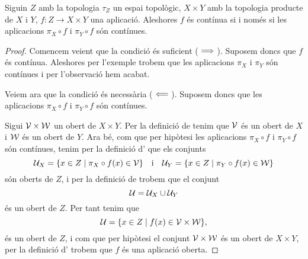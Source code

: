 \documentclass[../Apunts.tex]{subfiles}
\begin{document}
	\begin{theorem}
		\label{thm:una aplicació és contínua si i només si les seves components són contínues}
		Siguin \(Z\) amb la topologia \(\tau_{Z}\) un espai topològic, \(X\times Y\) amb la topologia producte de \(X\) i \(Y\), \(f\colon Z\longrightarrow X\times Y\) una aplicació. Aleshores \(f\) és contínua si i només si les aplicacions \(\pi_{X}\circ f\) i \(\pi_{Y}\circ f\) són contínues.
		\begin{proof}
			Comencem veient que la condició és suficient (\(\implies\)). Suposem doncs que \(f\) és contínua. Aleshores per l'exemple  trobem que les aplicacions \(\pi_{X}\) i \(\pi_{Y}\) són contínues i per l'observació  hem acabat.
			
			Veiem ara que la condició és necessària (\(\impliedby\)). Suposem doncs que les aplicacions \(\pi_{X}\circ f\) i \(\pi_{Y}\circ f\) són contínues.
			
			Sigui \(\mathcal{V}\times\mathcal{W}\) un obert de \(X\times Y\). Per la definició de  tenim que \(\mathcal{V}\) és un obert de \(X\) i \(\mathcal{W}\) és un obert de \(Y\). Ara bé, com que per hipòtesi les aplicacions \(\pi_{X}\circ f\) i \(\pi_{Y}\circ f\) són contínues, tenim per la definició d' que els conjunts
			\[\mathcal{U}_{X}=\{x\in Z\mid \pi_{X}\circ f(x)\in\mathcal{V}\}\quad\text{i}\quad
			\mathcal{U}_{Y}=\{x\in Z\mid \pi_{Y}\circ f(x)\in\mathcal{W}\}\]
			són oberts de \(Z\), i per la definició de  trobem que el conjunt
			\[\mathcal{U}=\mathcal{U}_{X}\cup\mathcal{U}_{Y}\]
			és un obert de \(Z\). Per tant tenim que
			\[\mathcal{U}=\{x\in Z\mid f(x)\in\mathcal{V}\times\mathcal{W}\},\]
			és un obert de \(Z\), i com que per hipòtesi el conjunt \(\mathcal{V}\times\mathcal{W}\) és un obert de \(X\times Y\), per la definició d' trobem que \(f\) és una aplicació oberta. %
		\end{proof}
	\end{theorem}
\end{document}
